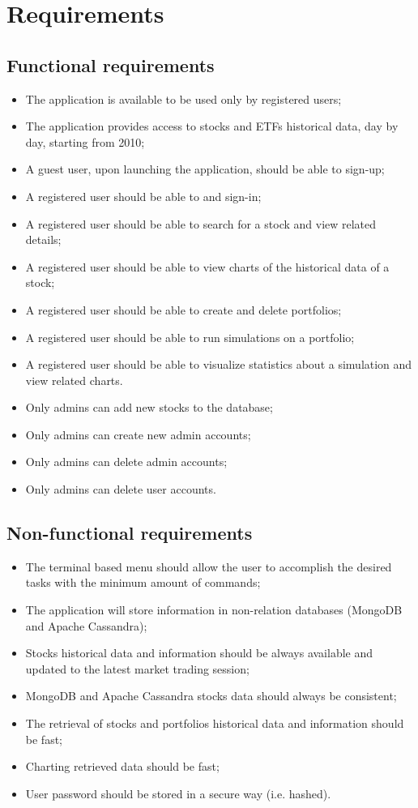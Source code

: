 \section{Requirements}
\subsection{Functional requirements}
\begin{itemize}
    \item The application is available to be used only by registered users;
    \item The application provides access to stocks and ETFs historical data, day by day, starting from 2010;\\
	\item A guest user, upon launching the application, should be able to sign-up;
	\item A registered user should be able to and sign-in;
	\item A registered user should be able to search for a stock and view related details;
	\item A registered user should be able to view charts of the historical data of a stock;
	\item A registered user should be able to create and delete portfolios;
	\item A registered user should be able to run simulations on a portfolio;
	\item A registered user should be able to visualize statistics about a simulation and view related charts.\\
	\item Only admins can add new stocks to the database;
	\item Only admins can create new admin accounts;
	\item Only admins can delete admin accounts;
	\item Only admins can delete user accounts.
\end{itemize}
\subsection{Non-functional requirements}
\begin{itemize}
    \item The terminal based menu should allow the user to accomplish the desired tasks with the minimum amount of commands;
    \item The application will store information in non-relation databases (MongoDB and Apache Cassandra);
    \item Stocks historical data and information should be always available and updated to the latest market trading session;
    \item MongoDB and Apache Cassandra stocks data should always be consistent;
	\item The retrieval of stocks and portfolios historical data and information should be fast;
	\item Charting retrieved data should be fast;
	\item User password should be stored in a secure way (i.e. hashed).
\end{itemize}
